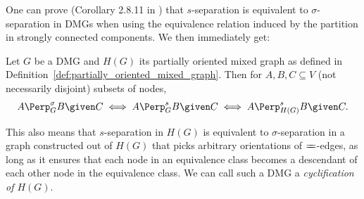One can prove (Corollary 2.8.11 in \cite{FM17}) that $s$-separation is equivalent to $\sigma$-separation in DMGs when using the equivalence relation induced by the partition in strongly connected components.
We then immediately get:
\begin{Prp}\label{prp:sigma_sep_as_s_sep}
  Let $G$ be a DMG and $H(G)$ its partially oriented mixed graph as defined in Definition~\ref{def:partially_oriented_mixed_graph}.
  Then for $A, B, C \subseteq V$ (not necessarily disjoint) subsets of nodes,
  $$A \Perp^\sigma_G B \given C \iff A \Perp^s_G B \given C \iff A \Perp^s_{H(G)} B \given C.$$
\end{Prp}
This also means that $s$-separation in $H(G)$ is equivalent to $\sigma$-separation in a graph constructed out of $H(G)$ that picks arbitrary orientations of $\otto$-edges, as long as it ensures that each node in an equivalence class becomes a descendant of each other node in the equivalence class. We can call such a DMG a \emph{cyclification of $H(G)$}.
